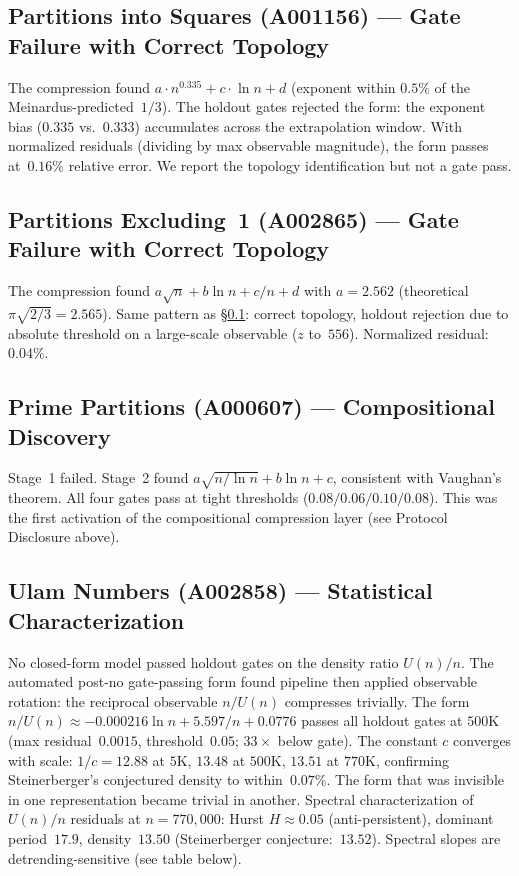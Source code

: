 \documentclass[12pt]{article}
\begin{document}
\subsection{Partitions into Squares (A001156) --- Gate Failure with Correct Topology}
\label{sec:meinardus}

The compression found $a \cdot n^{0.335} + c \cdot \ln n + d$ (exponent within $0.5\%$ of the Meinardus-predicted~$1/3$). The holdout gates rejected the form: the exponent bias ($0.335$ vs.~$0.333$) accumulates across the extrapolation window. With normalized residuals (dividing by max observable magnitude), the form passes at~$0.16\%$ relative error. We report the topology identification but not a gate pass.

\subsection{Partitions Excluding~1 (A002865) --- Gate Failure with Correct Topology}

The compression found $a\sqrt{n} + b\ln n + c/n + d$ with $a = 2.562$ (theoretical $\pi\sqrt{2/3} = 2.565$). Same pattern as \S\ref{sec:meinardus}: correct topology, holdout rejection due to absolute threshold on a large-scale observable ($z$ to~$556$). Normalized residual:~$0.04\%$.

\subsection{Prime Partitions (A000607) --- Compositional Discovery}

Stage~1 failed. Stage~2 found $a\sqrt{n/\ln n} + b\ln n + c$, consistent with Vaughan's theorem. All four gates pass at tight thresholds ($0.08/0.06/0.10/0.08$). This was the first activation of the compositional compression layer (see Protocol Disclosure above).

\subsection{Ulam Numbers (A002858) --- Statistical Characterization}

No closed-form model passed holdout gates on the density ratio $U(n)/n$. The automated post-no gate-passing form found pipeline then applied observable rotation: the reciprocal observable $n/U(n)$ compresses trivially. The form $n/U(n) \approx -0.000216 \ln n + 5.597/n + 0.0776$ passes all holdout gates at $500$K (max residual~$0.0015$, threshold~$0.05$; $33\times$ below gate). The constant $c$ converges with scale: $1/c = 12.88$ at $5$K, $13.48$ at $500$K, $13.51$ at $770$K, confirming Steinerberger's conjectured density to within~$0.07\%$. The form that was invisible in one representation became trivial in another. Spectral characterization of $U(n)/n$ residuals at $n = 770{,}000$: Hurst $H \approx 0.05$ (anti-persistent), dominant period~$17.9$, density~$13.50$ (Steinerberger conjecture:~$13.52$). Spectral slopes are detrending-sensitive (see table below).
\end{document}
